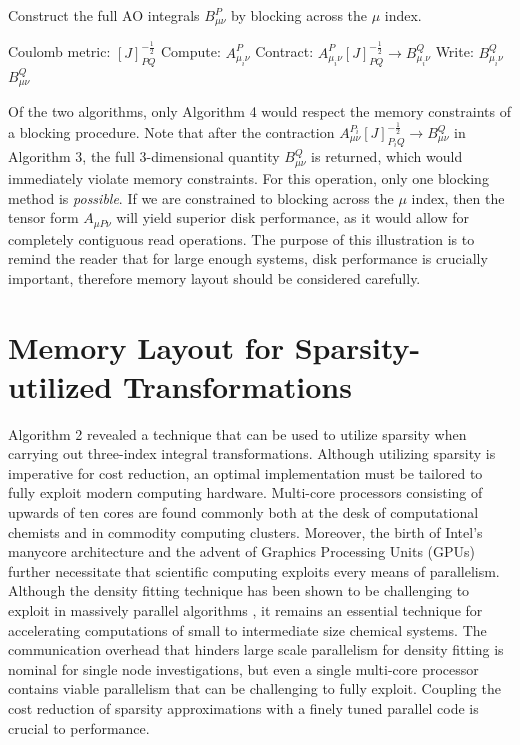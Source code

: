 \begin{algorithm}[H]
\caption{Construct the full AO integrals $B_{\mu \nu}^P$ by blocking across the $\mu$ index.}
\begin{algorithmic}
\REQUIRE Coulomb metric: $[J]_{PQ}^{-\frac{1}{2}}$
    \STATE Compute:  $A_{\mu_i \nu}^{P}$
    \STATE Contract: $A_{\mu_i \nu}^{P}[J]_{PQ}^{-\frac{1}{2}} \rightarrow B_{\mu_i \nu}^Q$
    \STATE Write:    $B_{\mu_i \nu}^Q$
\ENDFOR
\RETURN $B_{\mu \nu}^Q$
\end{algorithmic}
\end{algorithm}

Of the two algorithms, only Algorithm 4 would respect the memory constraints of a blocking procedure. Note that after the 
contraction $A_{\mu \nu}^{P_i} [J]_{P_iQ}^{-\frac{1}{2}} \rightarrow B_{\mu \nu}^Q$ in Algorithm 3, the full 3-dimensional quantity
$B_{\mu \nu}^Q$ is returned, which would immediately violate memory constraints. For this operation, only one blocking method is
\textit{possible}. If we are constrained to blocking across the $\mu$ index, then the tensor form $A_{\mu P \nu}$ will yield
superior disk performance, as it would allow for completely contiguous read operations. The purpose of this illustration is
to remind the reader that for large enough systems, disk performance
is crucially important, therefore memory layout should be considered carefully.

\section{Memory Layout for Sparsity-utilized Transformations}

Algorithm 2 revealed a technique that can be used to utilize sparsity when carrying out three-index integral transformations.
Although utilizing sparsity is imperative for cost reduction, an optimal implementation must be tailored to
fully exploit modern computing hardware.
Multi-core processors consisting of upwards of ten cores are found commonly both at the desk of computational
chemists and in commodity computing clusters.
Moreover, the birth of Intel's manycore architecture and the advent of Graphics Processing Units (GPUs)
further necessitate that scientific computing
exploits every means of parallelism.
Although the density fitting technique has been shown to be challenging to exploit in massively parallel
algorithms \cite{ref3}, it remains an essential technique for accelerating computations of 
small to intermediate size chemical systems.
The communication overhead that hinders large scale parallelism for density
fitting is nominal for single node investigations, but even a single multi-core processor contains viable
parallelism that can be challenging to fully exploit. 
Coupling the cost reduction of sparsity approximations with a finely tuned parallel code is crucial to performance.  

